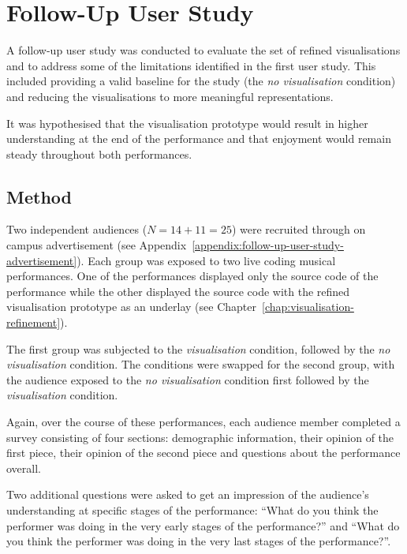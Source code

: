 
\chapter{Follow-Up User Study}
\label{chap:follow-up-user-study}

A follow-up user study was conducted to evaluate the set of refined visualisations and to address some of the limitations identified in the first user study. This included providing a valid baseline for the study (the \emph{no visualisation} condition) and reducing the visualisations to more meaningful representations.

It was hypothesised that the visualisation prototype would result in higher understanding at the end of the performance and that enjoyment would remain steady throughout both performances.

\section{Method}

Two independent audiences ($N=14+11=25$) were recruited through on campus advertisement (see Appendix~\ref{appendix:follow-up-user-study-advertisement}). Each group was exposed to two live coding musical performances. One of the performances displayed only the source code of the performance while the other displayed the source code with the refined visualisation prototype as an underlay (see Chapter~\ref{chap:visualisation-refinement}).

The first group was subjected to the \emph{visualisation} condition, followed by the \emph{no visualisation} condition. The conditions were swapped for the second group, with the audience exposed to the \emph{no visualisation} condition first followed by the \emph{visualisation} condition.

Again, over the course of these performances, each audience member completed a survey consisting of four sections: demographic information, their opinion of the first piece, their opinion of the second piece and questions about the performance overall. 

Two additional questions were asked to get an impression of the audience's understanding at specific stages of the performance: ``What do you think the performer was doing in the very early stages of the performance?'' and ``What do you think the performer was doing in the very last stages of the performance?''.

